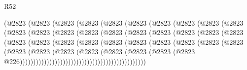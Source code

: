 \begin{lexlean}{R52}
\begin{coremodule}
                      (@2823
                        (@2823
                          (@2823
                            (@2823
                              (@2823
                                (@2823
                                  (@2823
                                    (@2823
                                      (@2823
                                        (@2823
                                          (@2823
                                            (@2823
                                              (@2823
                                                (@2823
                                                  (@2823
                                                    (@2823
                                                      (@2823
                                                        (@2823
                                                          (@2823
                                                            (@2823
                                                              (@2823
                                                                (@2823
                                                                  (@2823
                                                                    (@2823
                                                                      (@2823
                                                                        (@2823
                                                                          (@2823
                                                                            (@2823
                                                                              (@2823
                                                                                (@2823
                                                                                  (@2823
                                                                                    (@2823
                                                                                      (@2823
                                                                                        (@2823
                                                                                          (@2823
                                                                                            (@2823
                                                                                              (@2823
                                                                                                (@2823
                                                                                                  @226)))))))))))))))))))))))))))))))))))))))))))))))

\end{coremodule}
\end{lexlean}
